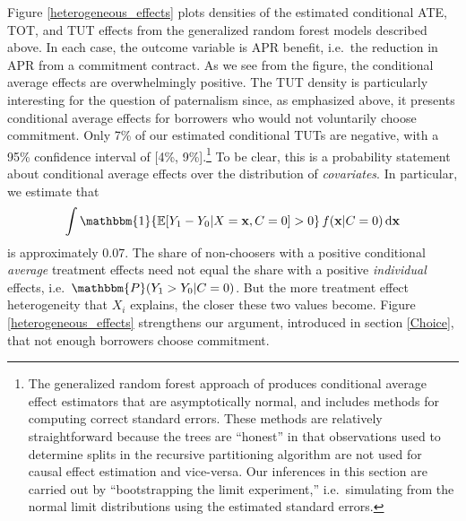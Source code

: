 \documentclass[oneside,11pt]{article}
\begin{document}
Figure \ref{heterogeneous_effects} plots densities of the estimated conditional ATE, TOT, and TUT effects from the generalized random forest models described above.
In each case, the outcome variable is APR benefit, i.e.\ the reduction in APR from a commitment contract.
As we see from the figure, the conditional average effects are overwhelmingly positive. 
The TUT density is particularly interesting for the question of paternalism since, as emphasized above, it presents conditional average effects for borrowers who would not voluntarily choose commitment.
Only 7\% of our estimated conditional TUTs are negative, with a 95\% confidence interval of [4\%, 9\%].\footnote{The generalized random forest approach of \cite{atheygrf} produces conditional average effect estimators that are asymptotically normal, and includes methods for computing correct standard errors. These methods are relatively straightforward because the trees are ``honest'' in that observations used to determine splits in the recursive partitioning algorithm are not used for causal effect estimation and vice-versa. Our inferences in this section are carried out by ``bootstrapping the limit experiment,'' i.e.\ simulating from the normal limit distributions using the estimated standard errors.} 
To be clear, this is a probability statement about conditional average effects over the distribution of \emph{covariates}.
In particular, we estimate that   
\[
\int \mathbbm{1}\{\mathbb{E}[Y_1 - Y_0| X = \mathbf{x}, C = 0] > 0\} \, f(\mathbf{x}|C=0) \, \mathrm{d}\mathbf{x} 
\]
is approximately 0.07.
The share of non-choosers with a positive conditional \emph{average} treatment effects need not equal the share with a positive \emph{individual} effects, i.e.\ $\mathbbm{P}(Y_1 > Y_0| C = 0)$.
But the more treatment effect heterogeneity that $X_i$ explains, the closer these two values become.
Figure \ref{heterogeneous_effects} strengthens our argument, introduced in section \ref{Choice}, that not enough borrowers choose commitment. 
\end{document}
